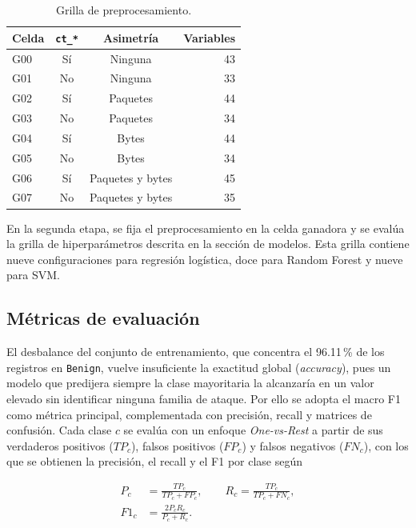 \documentclass[conference]{IEEEtran}
\begin{document}
\begin{table}[!t]
\centering
\caption{Grilla de preprocesamiento.}
\label{tab:grilla_preprocesamiento}
\footnotesize
\begin{tabular}{@{}lccr@{}}
\hline
\textbf{Celda} & \textbf{\texttt{ct\_*}} & \textbf{Asimetría} & \textbf{Variables} \\
\hline
G00 & Sí & Ninguna & 43 \\
G01 & No & Ninguna & 33 \\
G02 & Sí & Paquetes & 44 \\
G03 & No & Paquetes & 34 \\
G04 & Sí & Bytes & 44 \\
G05 & No & Bytes & 34 \\
G06 & Sí & Paquetes y bytes & 45 \\
G07 & No & Paquetes y bytes & 35 \\
\hline
\end{tabular}
\end{table}

En la segunda etapa, se fija el preprocesamiento en la celda ganadora y se evalúa la grilla de hiperparámetros descrita en la sección de modelos. Esta grilla contiene nueve configuraciones para regresión logística, doce para Random Forest y nueve para SVM.

\FloatBarrier
\subsection{Métricas de evaluación}

El desbalance del conjunto de entrenamiento, que concentra el 96.11\,\% de los registros en \texttt{Benign}, vuelve insuficiente la exactitud global (\textit{accuracy}), pues un modelo que predijera siempre la clase mayoritaria la alcanzaría en un valor elevado sin identificar ninguna familia de ataque. Por ello se adopta el macro F1 como métrica principal, complementada con precisión, recall y matrices de confusión. Cada clase $c$ se evalúa con un enfoque \textit{One-vs-Rest} a partir de sus verdaderos positivos ($TP_c$), falsos positivos ($FP_c$) y falsos negativos ($FN_c$), con los que se obtienen la precisión, el recall y el F1 por clase según

\begin{equation}
\begin{aligned}
P_c &= \frac{TP_c}{TP_c+FP_c}, \qquad
R_c = \frac{TP_c}{TP_c+FN_c},\\
F1_c &= \frac{2P_cR_c}{P_c+R_c}.
\end{aligned}
\end{equation}
\end{document}
